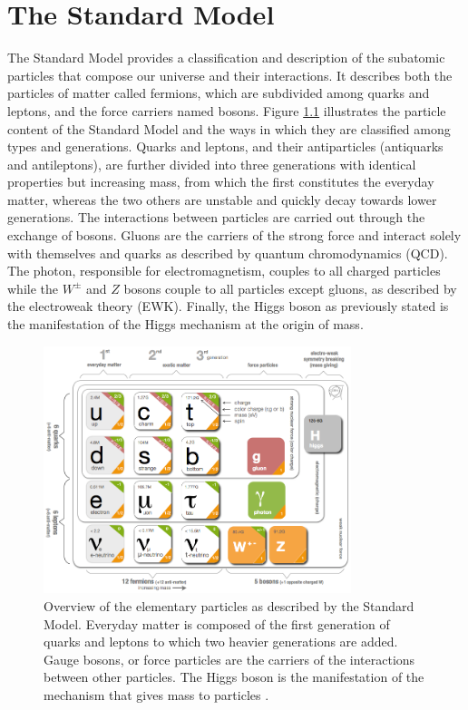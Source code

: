 \chapter{The Standard Model}
\label{chap:I-1-standard-model}

  The Standard Model provides a classification and description of the subatomic particles that compose our universe and their interactions. It describes both the particles of matter called fermions, which are subdivided among quarks and leptons, and the force carriers named bosons. Figure \ref{fig:I-1-sm-particles} illustrates the particle content of the Standard Model and the ways in which they are classified among types and generations. Quarks and leptons, and their antiparticles (antiquarks and antileptons), are further divided into three generations with identical properties but increasing mass, from which the first constitutes the everyday matter, whereas the two others are unstable and quickly decay towards lower generations. The interactions between particles are carried out through the exchange of bosons. Gluons are the carriers of the strong force and interact solely with themselves and quarks as described by quantum chromodynamics (QCD). The photon, responsible for electromagnetism, couples to all charged particles while the $ W^\pm $ and $ Z $ bosons couple to all particles except gluons, as described by the electroweak theory (EWK). Finally, the Higgs boson as previously stated is the manifestation of the Higgs mechanism at the origin of mass. \\

	\begin{figure}[h!]
		\centering
		\includegraphics[width=0.8\textwidth]{img/I-1-standard-model/sm-particles.png}
		\caption{Overview of the elementary particles as described by the Standard Model. Everyday matter is composed of the first generation of quarks and leptons to which two heavier generations are added. Gauge bosons, or force particles are the carriers of the interactions between other particles. The Higgs boson is the manifestation of the mechanism that gives mass to particles \cite{HOME-CERN}.}
		\label{fig:I-1-sm-particles}
	\end{figure}

